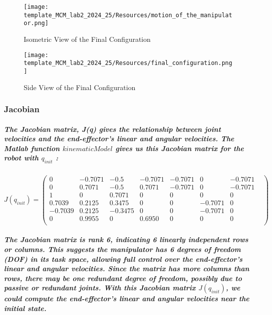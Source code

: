 \begin{figure}[h!]
    \begin{minipage}{0.5\textwidth}
        \centering
        \texttt{[image: template\_MCM\_lab2\_2024\_25/Resources/motion\_of\_the\_manipulator.png]}
        \caption{Isometric View of the Final Configuration}
        \label{fig:Final Configuration1}
    \end{minipage}%
    \hfill
    \begin{minipage}{0.5\textwidth}
        \centering
        \texttt{[image: template\_MCM\_lab2\_2024\_25/Resources/final\_configuration.png]}
        \caption{Side View of the Final Configuration}
        \label{fig:Final Configuration2}
    \end{minipage}
\end{figure}

\subsubsection{Jacobian}
\subparagraph{
The Jacobian matrix, J(q) gives the relationship between joint velocities and the end-effector's linear and angular velocities. The Matlab function $kinematicModel$ gives us this Jacobian matrix for the robot with $q_{init}$ :
}

\[J(q_{init}) = \begin{pmatrix}
        0 & -0.7071 & -0.5 & -0.7071 & -0.7071 & 0 & -0.7071 \\
        0 & 0.7071 & -0.5 & 0.7071 & -0.7071 & 0 & -0.7071 \\
        1 & 0 & 0.7071 & 0 & 0 & 0 & 0 &  \\
        0.7039 & 0.2125 & 0.3475 & 0 & 0 & -0.7071 & 0 \\
        -0.7039 & 0.2125 & -0.3475 & 0 & 0 & -0.7071 & 0 \\
        0 & 0.9955 & 0 & 0.6950 & 0 & 0 & 0 \\
    \end{pmatrix}\]


\subparagraph{The Jacobian matrix is rank 6, indicating 6 linearly independent rows or columns. This suggests the manipulator has 6 degrees of freedom (DOF) in its task space, allowing full control over the end-effector's linear and angular velocities. Since the matrix has more columns than rows, there may be one redundant degree of freedom, possibly due to passive or redundant joints. With this Jacobian matrix $J(q_{init})$, we could compute the end-effector's linear and angular velocities near the initial state.}

